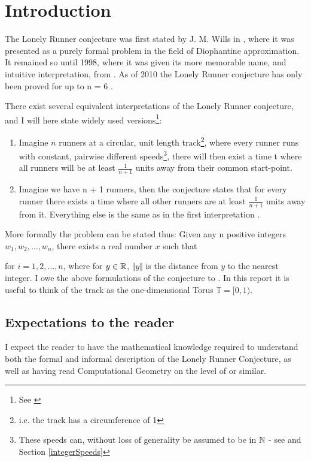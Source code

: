 \section{Introduction}
\label{introduction}
The Lonely Runner conjecture was first stated by J. M. Wills in \cite{JMWills}, where it was presented as a purely formal problem in the field of Diophantine approximation. It remained so until 1998, where it was given its more memorable name, and intuitive interpretation, from \cite{Bienia97flows.view-obstructions}. As of 2010 the Lonely Runner conjecture has only been proved for up to n = 6 \cite{serra_thelonely}.

There exist several equivalent interpretations of the Lonely Runner conjecture, and I will here state widely used versions\footnote{See \cite{ANote}}:
\begin{enumerate}
\item Imagine $n$ runners at a circular, unit length track\footnote{i.e. the track has a circumference of 1}, where every runner runs with constant, pairwise different speeds\footnote{These speeds can, without loss of generality be assumed to be in $\mathbb{N}$ - see \cite{Bienia97flows.view-obstructions} and Section \ref{integerSpeeds}}, there will then exist a time t where all runners will be at least $\frac{1}{n + 1}$ units away from their common start-point.\\

\item Imagine we have n + 1 runners, then the conjecture states that for every runner there exists a time where all other runners are at least $\frac{1}{n + 1}$ units away from it. Everything else is the same as in the first interpretation \cite{Bienia97flows.view-obstructions}.\\
\end{enumerate}

More formally the problem can be stated thus: 
Given any n positive integers $w_1, w_2, \ldots, w_n$, there exists a real number $x$ such that 

for $i = 1, 2, \ldots, n$, where for $y \in \mathbb{R}$, $\Vert y \Vert$ is the distance from $y$ to the nearest integer. I owe the above formulations of the conjecture to \cite{ANote}. In this report it is useful to think of the track as the one-dimensional Torus $\mathbb{T} = [0,1)$.

\subsection{Expectations to the reader}
I expect the reader to have the mathematical knowledge required to understand both the formal and informal description of the Lonely Runner Conjecture, as well as having read Computational Geometry on the level of \cite{citeulike:3347056} or similar.

